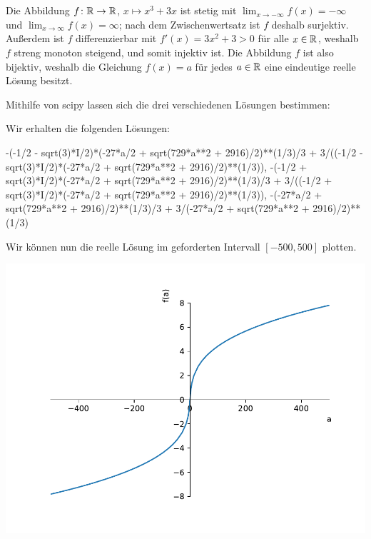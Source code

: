 \section{}

Die Abbildung $f \colon \mathbb{R} \to \mathbb{R}$, $x \mapsto x^3 + 3x$ ist stetig mit $\lim_{x \to -\infty} f(x) = -\infty$ und $\lim_{x \to \infty} f(x) = \infty$;
nach dem Zwischenwertsatz ist $f$ deshalb surjektiv.
Außerdem ist $f$ differenzierbar mit $f'(x) = 3 x^2 + 3 > 0$ für alle $x \in \mathbb{R}$, weshalb $f$ streng monoton steigend, und somit injektiv ist.
Die Abbildung $f$ ist also bijektiv, weshalb die Gleichung $f(x) = a$ für jedes $a \in \mathbb{R}$ eine eindeutige reelle Lösung besitzt.

Mithilfe von scipy lassen sich die drei verschiedenen Lösungen bestimmen:



Wir erhalten die folgenden Lösungen:

\begin{consoleoutput}
{-(-1/2 - sqrt(3)*I/2)*(-27*a/2 + sqrt(729*a**2 + 2916)/2)**(1/3)/3 + 3/((-1/2 - sqrt(3)*I/2)*(-27*a/2 + sqrt(729*a**2 + 2916)/2)**(1/3)), -(-1/2 + sqrt(3)*I/2)*(-27*a/2 + sqrt(729*a**2 + 2916)/2)**(1/3)/3 + 3/((-1/2 + sqrt(3)*I/2)*(-27*a/2 + sqrt(729*a**2 + 2916)/2)**(1/3)), -(-27*a/2 + sqrt(729*a**2 + 2916)/2)**(1/3)/3 + 3/(-27*a/2 + sqrt(729*a**2 + 2916)/2)**(1/3)}
\end{consoleoutput}

Wir können nun die reelle Lösung im geforderten Intervall $[-500, 500]$ plotten.

\begin{center}
  \includegraphics[width = \textwidth]{chapter_05/exercise_05_26_figure.pdf}
\end{center}

